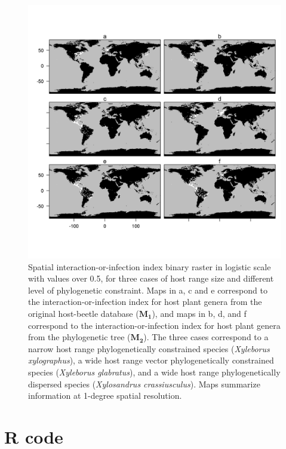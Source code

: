 \documentclass[utf8]{frontiers_suppmat} %
\begin{document}
\begin{figure}[h!]
\begin{center}
\includegraphics[width=15cm]{S2}%
\end{center}

\caption{Spatial interaction-or-infection index binary raster in logistic scale with values over 0.5, for three cases of host range size and different level of phylogenetic constraint. Maps in a, c and e correspond to the interaction-or-infection index for host plant genera from the original host-beetle database ($\mathbf{M_1}$), and maps in b, d, and f correspond to the interaction-or-infection index for host plant genera from the phylogenetic tree ($\mathbf{M_2}$). The three cases correspond to a narrow host range phylogenetically constrained species (\textit{Xyleborus xylographus}), a wide host range vector phylogenetically constrained species (\textit{Xyleborus glabratus}), and a wide host range phylogenetically dispersed species (\textit{Xylosandrus crassiusculus}). Maps summarize information at 1-degree spatial resolution. }\label{fig:2}
\end{figure}


\clearpage

\section{R code}
\end{document}
